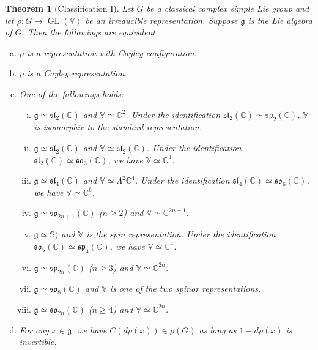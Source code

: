 \documentclass[11pt,reqno]{amsart}
\DeclareMathOperator{\GL}{GL}
\newtheorem{theorem}{Theorem}[section]
\newcommand{\CC}{\mathbb{C}} %
\begin{document}
\begin{theorem}[Classification I]\label{thm:classification1}
Let $G$ be a classical complex simple Lie group and let $\rho: G \to \GL(\mathbb{V})$ be an irreducible representation.  Suppose $\mathfrak{g}$ is the Lie algebra of $G$.  Then the followings are equivalent
\begin{enumerate}[(a)]
\item $\rho$ is a representation with Cayley configuration. \label{thm:classification1 item1}
\item $\rho$ is a Cayley representation.\label{thm:classification1 item2}
\item One of the followings holds: \label{thm:classification1 item3}
\begin{enumerate}[(i)]
\item $\mathfrak{g} \simeq \mathfrak{sl}_2(\CC)$ and $\mathbb{V} \simeq \mathbb{C}^2$.  Under the identification $\mathfrak{sl}_2(\CC) \simeq \mathfrak{sp}_2(\CC)$,  $\mathbb{V}$ is isomorphic to the standard representation.\label{eg: sl2 standard}
\item $\mathfrak{g} \simeq \mathfrak{sl}_2(\mathbb{C})$ and $\mathbb{V} \simeq \mathfrak{sl}_2(\mathbb{C})$.  Under the identification $\mathfrak{sl}_2(\CC) \simeq \mathfrak{so}_3(\CC)$,  we have $\mathbb{V} \simeq \mathbb{C}^3$. \label{eg: sl2 adjoint}
\item $\mathfrak{g} \simeq \mathfrak{sl}_4(\CC)$ and $\mathbb{V} \simeq \mathsf{\Lambda}^2 \mathbb{C}^4$.  Under the identification $\mathfrak{sl}_4(\mathbb{C}) \simeq \mathfrak{so}_6(\mathbb{C})$,  we have $\mathbb{V}\simeq \mathbb{C}^6$.\label{eg: sl4}
\item $\mathfrak{g} \simeq \mathfrak{so}_{2n+1}(\CC)$ ($n \ge 2$) and $\mathbb{V} \simeq \mathbb{C}^{2n+1}$.  \label{eg: so standard}
\item $\mathfrak{g} \simeq \mathbb{S})$ and $\mathbb{V}$ is the spin representation.  Under the identification $\mathfrak{so}_5(\CC) \simeq \mathfrak{sp}_4(\CC)$,  we have $\mathbb{V} \simeq \mathbb{C}^4$. \label{eg: so5 spin}
\item $\mathfrak{g} \simeq \mathfrak{sp}_{2n}(\CC)$ ($n \ge 3$) and $\mathbb{V} \simeq \mathbb{C}^{2n}$.  \label{eg: sp standard}
\item $\mathfrak{g} \simeq \mathfrak{so}_{8}(\CC)$ and $\mathbb{V}$ is one of the two spinor representations. \label{eg: so8 spin}
\item $\mathfrak{g} \simeq \mathfrak{so}_{2n}(\CC)$ ($n \ge 4$) and $\mathbb{V} \simeq \mathbb{C}^{2n}$.\label{eg: so standard}
\end{enumerate}
\item {For any $x \in \mathfrak{g}$,  we have $C(d\rho(x)) \in \rho(G)$ as long as  $1 - d\rho(x)$ is invertible. } \label{thm:classification1 item4}
\end{enumerate}
\end{theorem}
\end{document}
